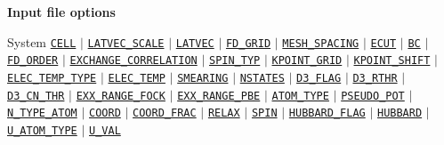   
  
  \begin{frame}[allowframebreaks]{\textbf{Input file options}} \label{Index}
  \vspace{-2mm}
  \begin{block}{System}
  \hyperlink{CELL}{\texttt{CELL}} $\vert$
  \hyperlink{LATVEC_SCALE}{\texttt{LATVEC\_SCALE}} $\vert$
  \hyperlink{LATVEC}{\texttt{LATVEC}}  $\vert$
  \hyperlink{FD_GRID}{\texttt{FD\_GRID}} $\vert$
  \hyperlink{MESH_SPACING}{\texttt{MESH\_SPACING}} $\vert$
  \hyperlink{ECUT}{\texttt{ECUT}} $\vert$
  \hyperlink{BC}{\texttt{BC}} $\vert$
  \hyperlink{FD_ORDER}{\texttt{FD\_ORDER}} $\vert$
  \hyperlink{EXCHANGE_CORRELATION}{\texttt{EXCHANGE\_CORRELATION}} $\vert$
  \hyperlink{SPIN_TYP}{\texttt{SPIN\_TYP}} $\vert$
  \hyperlink{KPOINT_GRID}{\texttt{KPOINT\_GRID}} $\vert$
  \hyperlink{KPOINT_SHIFT}{\texttt{KPOINT\_SHIFT}} $\vert$
  \hyperlink{ELEC_TEMP_TYPE}{\texttt{ELEC\_TEMP\_TYPE}} $\vert$
  \hyperlink{ELEC_TEMP}{\texttt{ELEC\_TEMP}} $\vert$
  \hyperlink{SMEARING}{\texttt{SMEARING}} $\vert$
  \hyperlink{NSTATES}{\texttt{NSTATES}}     $\vert$
  \hyperlink{D3_FLAG}{\texttt{D3\_FLAG}} $\vert$
  \hyperlink{D3_RTHR}{\texttt{D3\_RTHR}} $\vert$
  \hyperlink{D3_CN_THR}{\texttt{D3\_CN\_THR}} $\vert$
  \hyperlink{EXX_RANGE_FOCK}{\texttt{EXX\_RANGE\_FOCK}} $\vert$ 
  \hyperlink{EXX_RANGE_PBE}{\texttt{EXX\_RANGE\_PBE}} $\vert$ 
  \hyperlink{ATOM_TYPE}{\texttt{ATOM\_TYPE}} $\vert$
  \hyperlink{PSEUDO_POT}{\texttt{PSEUDO\_POT}}  $\vert$
  \hyperlink{N_TYPE_ATOM}{\texttt{N\_TYPE\_ATOM}} $\vert$
  \hyperlink{COORD}{\texttt{COORD}} $\vert$
  \hyperlink{COORD_FRAC}{\texttt{COORD\_FRAC}} $\vert$
  \hyperlink{RELAX}{\texttt{RELAX}} $\vert$
  \hyperlink{SPIN}{\texttt{SPIN}} $\vert$
  \hyperlink{HUBBARD_FLAG}{\texttt{HUBBARD\_FLAG}} $\vert$
  \hyperlink{HUBBARD}{\texttt{HUBBARD}} $\vert$
  \hyperlink{U_ATOM_TYPE}{\texttt{U\_ATOM\_TYPE}} $\vert$
  \hyperlink{U_VAL}{\texttt{U\_VAL}} 
  \end{block}
  

\end{frame}
